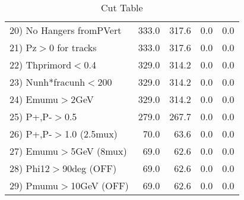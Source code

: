\begin{table}[h!]
\begin{tabular}{||l||r|r|r|r||}
 20) No Hangers fromPVert &       333.0 &       317.6 &         0.0 &         0.0 \\
 21) Pz$>$0 for tracks    &       333.0 &       317.6 &         0.0 &         0.0 \\
 22) Thprimord$<$0.4      &       329.0 &       314.2 &         0.0 &         0.0 \\
 23) Nunh*fracunh$<$200   &       329.0 &       314.2 &         0.0 &         0.0 \\
 24) Emumu$>$2GeV         &       329.0 &       314.2 &         0.0 &         0.0 \\
 25) P+,P-$>$0.5          &       279.0 &       267.7 &         0.0 &         0.0 \\
 26) P+,P-$>$1.0 (2.5mux) &        70.0 &        63.6 &         0.0 &         0.0 \\
 27) Emumu$>$5GeV  (8mux) &        69.0 &        62.6 &         0.0 &         0.0 \\
 28) Phi12$>$90deg  (OFF) &        69.0 &        62.6 &         0.0 &         0.0 \\
 29) Pmumu$>$10GeV  (OFF) &        69.0 &        62.6 &         0.0 &         0.0 \\
 \hline
 \hline
 \end{tabular}
 \caption{Cut Table \cohjp  }
 \label{tab-cut__jpsi}
 \end{table}

